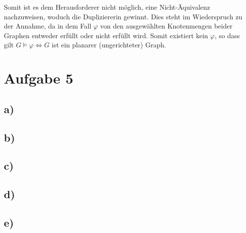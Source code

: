 \documentclass[11pt, a4paper]{article}
\begin{document}
Somit ist es dem Herausforderer nicht möglich, eine Nicht-Äquivalenz nachzuweisen, woduch die Dupliziererin gewinnt.
Dies steht im Wiederspruch zu der Annahme, da in dem Fall $\varphi$ von den ausgewählten Knotenmengen beider Graphen entweder erfüllt oder nicht erfüllt wird.
Somit existiert kein $\varphi$, so dass gilt $G \models \varphi \iff G$ ist ein planarer (ungerichteter) Graph.




\section*{Aufgabe 5}
\subsection*{a)}

\subsection*{b)}

\subsection*{c)}

\subsection*{d)}

\subsection*{e)}
\end{document}
